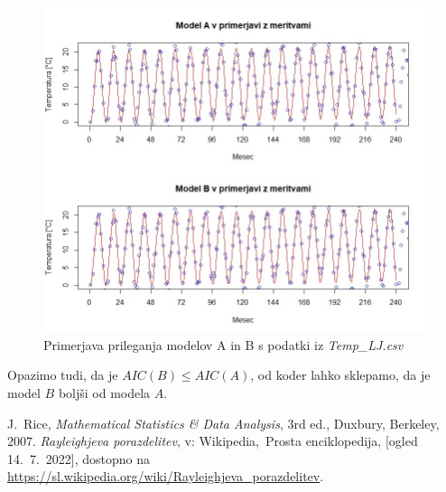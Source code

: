 \documentclass[a4paper, 10pt]{article}
\begin{document}
	\begin{figure}[h!]
		\label{fig: 3BCompare}
		\centering
		\includegraphics[scale=0.4]{PrimerjavaModelov}
		\caption{Primerjava prileganja modelov A in B s podatki iz \textit{Temp\_LJ.csv}}
	\end{figure}
	
	 Opazimo tudi, da je $AIC(B) \leq AIC(A)$, od koder lahko sklepamo, da je model $B$ boljši od modela $A$.
	
	\begin{thebibliography}{3}
		 J.~Rice, \emph{Mathematical Statistics \& Data Analysis}, 3rd ed., Duxbury, Berkeley, $2007$.
		 \emph{Rayleighjeva porazdelitev}, v: Wikipedia,~Prosta enciklopedija, [ogled 14.~7.~2022], dostopno na \url{https://sl.wikipedia.org/wiki/Rayleighjeva_porazdelitev}.
	\end{thebibliography}
\end{document}
